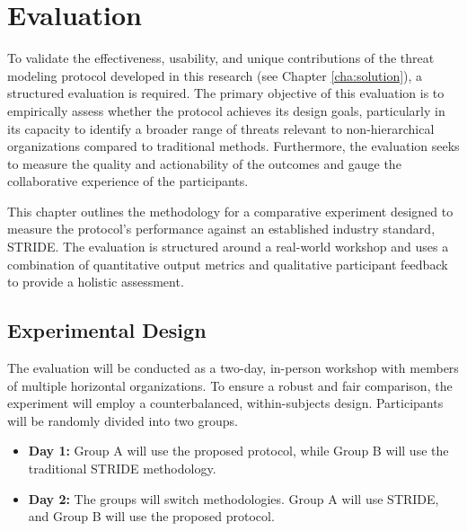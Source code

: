
%

\chapter{Evaluation}
\label{cha:evaluation}

\glsresetall

To validate the effectiveness, usability, and unique contributions of the threat
modeling protocol developed in this research (see Chapter \ref{cha:solution}), a
structured evaluation is required. The primary objective of this evaluation is
to empirically assess whether the protocol achieves its design goals,
particularly in its capacity to identify a broader range of threats relevant to
non-hierarchical organizations compared to traditional methods. Furthermore, the
evaluation seeks to measure the quality and actionability of the outcomes and
gauge the collaborative experience of the participants.

This chapter outlines the methodology for a comparative experiment designed to
measure the protocol's performance against an established industry standard,
STRIDE. The evaluation is structured around a real-world workshop and uses a
combination of quantitative output metrics and qualitative participant feedback
to provide a holistic assessment.

\section{Experimental Design}
\label{sec:experimental_design}

The evaluation will be conducted as a two-day, in-person workshop with members
of multiple horizontal organizations. To ensure a robust and fair comparison, the
experiment will employ a counterbalanced, within-subjects design. Participants
will be randomly divided into two groups.

\begin{itemize}
\item \textbf{Day 1:} Group A will use the proposed protocol, while Group B will
use the traditional STRIDE methodology.
\item \textbf{Day 2:} The groups will switch methodologies. Group A will use
STRIDE, and Group B will use the proposed protocol.
\end{itemize}

